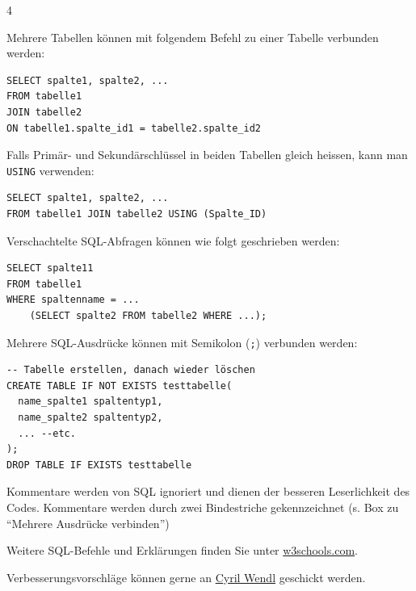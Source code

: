 \begin{landscape}
\begin{multicols*}{4}
\begin{cheatSheetBox}[title=Mehrere Tabellen verbinden: \texorpdfstring{\lstinline|JOIN|}{JOIN}]
Mehrere Tabellen können mit folgendem Befehl zu einer Tabelle verbunden werden:

\begin{lstlisting}
SELECT spalte1, spalte2, ...
FROM tabelle1 
JOIN tabelle2 
ON tabelle1.spalte_id1 = tabelle2.spalte_id2
\end{lstlisting}

Falls Primär- und Sekundärschlüssel in beiden Tabellen gleich heissen, kann man \lstinline|USING| verwenden:
\begin{lstlisting}
SELECT spalte1, spalte2, ...
FROM tabelle1 JOIN tabelle2 USING (Spalte_ID)
\end{lstlisting}
\end{cheatSheetBox}

\begin{cheatSheetBox}[title=Verschachtelte Abfragen]
Verschachtelte \acrshort{SQL}-Abfragen können wie folgt geschrieben werden:
\begin{lstlisting}
SELECT spalte11 
FROM tabelle1
WHERE spaltenname = ...
    (SELECT spalte2 FROM tabelle2 WHERE ...);
\end{lstlisting}
\end{cheatSheetBox}

\begin{cheatSheetBox}[title=Mehrere Ausdrücke verbinden]
Mehrere SQL-Ausdrücke können mit Semikolon (\texttt{;}) verbunden werden:
\begin{lstlisting}
-- Tabelle erstellen, danach wieder löschen
CREATE TABLE IF NOT EXISTS testtabelle(
  name_spalte1 spaltentyp1,
  name_spalte2 spaltentyp2,
  ... --etc.
);
DROP TABLE IF EXISTS testtabelle
\end{lstlisting}
\end{cheatSheetBox}

\begin{cheatSheetBox}[title=Kommentare]
Kommentare werden von SQL ignoriert und dienen der besseren Leserlichkeit des Codes. Kommentare werden durch zwei Bindestriche gekennzeichnet (s. Box zu \enquote{Mehrere Ausdrücke verbinden})
\end{cheatSheetBox}

\begin{cheatSheetBox}[title=Weitere Befehle \& Feedback]
Weitere \acrshort{SQL}-Befehle und Erklärungen finden Sie unter \href{https://www.w3schools.com/sql/default.asp}{w3schools.com}.

Verbesserungsvorschläge können gerne an \href{mailto:cyril.wendl@edu.zh.ch}{Cyril Wendl} geschickt werden.
\end{cheatSheetBox}

\end{multicols*}

\end{landscape}

